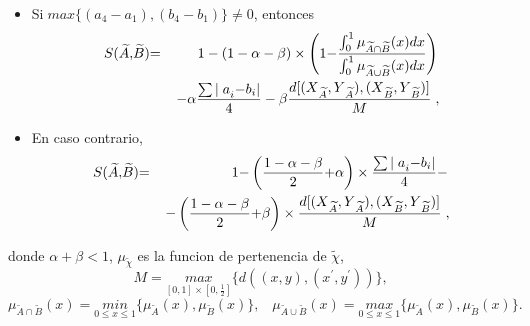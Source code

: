 {{		
		
		\begin{itemize}
			\item Si$\;{max} \{(a_{4}-a_{1}),(b_{4}-b_{1})\}\neq 0$, entonces
			\begin{eqnarray*}
				{\small S(}\widetilde{A}{\small ,}\widetilde{B}{\small )} &{\small =}&%
				\left. {\small 1-(1-\alpha -\beta })\times \left ( {\small 1-}\frac{\int_{0}^{1}%
					{\small \mu }_{\widetilde{A}\cap \widetilde{B}}{\small (x)dx}}{\int_{0}^{1}%
					{\small \mu }_{\widetilde{A}\cup \widetilde{B}}{\small (x)dx}}\right)
				\right.  \\
				&&\left. -{\small \alpha } \frac{\sum {\small \mid a}_{i}{\small -b}_{i}%
					{\small \mid }}{{\small 4}}-{\small \beta }\frac{{\small d[(X}_{\widetilde{A}%
					}{\small ,Y}_{\widetilde{A}}{\small ),(X}_{\widetilde{B}}{\small ,Y}_{%
						\widetilde{B}}{\small )]}}{{\small M}}\right., 
			\end{eqnarray*}
			
			\item En caso contrario,%
			\begin{eqnarray*}
				{\small S(}\widetilde{A}{\small ,}\widetilde{B}{\small )} &{\small =}&%
				\left. {\small 1-}%
				\left( \frac{{\small 1-\alpha -\beta }}{{\small 2}}{\small +\alpha } \right) \times
				\frac{\sum {\small \mid a}_{i}{\small -b}_{i}{\small \mid }}{{\small 4}}%
				{\small -}\right.  \\
				&&\left. {\small -}\left( \frac{{\small 1-\alpha -\beta }}{{\small 2}}%
				{\small +\beta }\right)\times \frac{{\small d[(X}_{\widetilde{A}}{\small ,Y}_{%
						\widetilde{A}}{\small ),(X}_{\widetilde{B}}{\small ,Y}_{\widetilde{B}}%
					{\small )]}}{{\small M}}\right., 
			\end{eqnarray*}
		\end{itemize}
		donde $\alpha +\beta <1$, $\mu _{\widetilde{\chi }}$ es la funcion de pertenencia de $\widetilde{\chi}$, 
		\begin{equation}
		M=\underset{[0,1]\times[0,\frac{1}{2}]}{max}\{d((x,y),(x^{\prime },y^{\prime }))\}\text{,} 
		\end{equation}%
		\begin{equation*}
		\mu _{\widetilde{A}\cap \widetilde{B}}(x)=\underset{0\leq x\leq 1}{min}%
		\{\mu _{\widetilde{A}}(x),\mu _{\widetilde{B}}(x)\} ,
		\;\;\; \mu _{\widetilde{A}\cup \widetilde{B}}(x)=\underset{0\leq x\leq 1}{max}%
		\{\mu _{\widetilde{A}}(x),\mu _{\widetilde{B}}(x)\}.
		\end{equation*}%
		
}}
